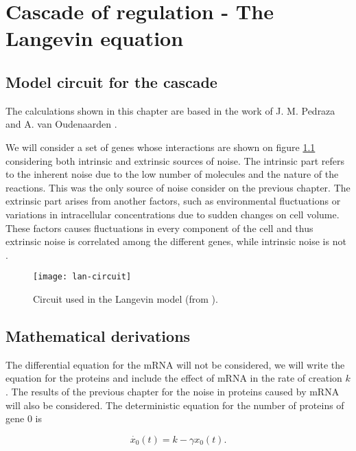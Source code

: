 \chapter{Cascade of regulation - The Langevin equation}

\section{Model circuit for the cascade}
The calculations shown in this chapter are based in the work of J. M. Pedraza and A. van Oudenaarden \cite{pedraza05}. 

We will consider a set of genes whose interactions are shown on figure \ref{fig:lan-circuit} considering both intrinsic and extrinsic sources of noise. The intrinsic part refers to the inherent noise due to the low number of molecules and the nature of the reactions. This was the only source of noise consider on the previous chapter. The extrinsic part arises from another factors, such as environmental fluctuations or variations in intracellular concentrations due to sudden changes on cell volume. These factors causes fluctuations in every component of the cell and thus extrinsic noise is correlated among the different genes, while intrinsic noise is not \cite{elowitz02}.


\begin{figure}[H]
  \centering
  \texttt{[image: lan-circuit]}
  \caption[Circuit used for the Langevin model]{\label{fig:lan-circuit} Circuit used in the Langevin model (from \cite{pedraza05}).}
\end{figure}

\section{Mathematical derivations}

The differential equation for the mRNA will not be considered, we will write the equation for the proteins and include the effect of mRNA in the rate of creation $k$. The results of the previous chapter for the noise in proteins caused by mRNA will also be considered. The deterministic equation for the number of proteins of gene $0$ is 

\begin{equation}
\label{eq:detgene0}
\dot{x_0}(t) = k - \gamma x_0(t).
\end{equation}

